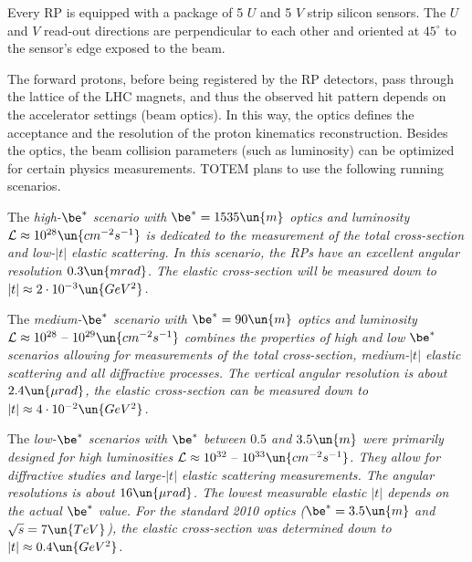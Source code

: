 
Every RP is equipped with a package of 5 $U$ and 5 $V$ strip silicon sensors. The $U$ and $V$ read-out directions are perpendicular to each other and oriented at $45^\circ$ to the sensor's edge exposed to the beam.

The forward protons, before being registered by the RP detectors, pass through the lattice of the LHC magnets, and thus the observed hit pattern depends on the accelerator settings (beam optics). In this way, the optics defines the acceptance and the resolution of the proton kinematics reconstruction. Besides the optics, the beam collision parameters (such as luminosity) can be optimized for certain physics measurements. TOTEM plans to use the following running scenarios.

\> The \em{high-$\be^*$} scenario with $\be^* = 1535\un{m}$ optics and luminosity ${\cal L} \approx 10^{28} \un{cm^{-2}s^{-1}}$ is dedicated to the measurement of the total cross-section and low-$|t|$ elastic scattering. In this scenario, the RPs have an excellent angular resolution $0.3\un{mrad}$. The elastic cross-section will be measured down to $|t| \approx 2\cdot10^{-3}\un{GeV^2}$.

\> The \em{medium-$\be^*$} scenario with $\be^* = 90\un{m}$ optics and luminosity ${\cal L} \approx 10^{28} \hbox{ -- } 10^{29}\un{cm^{-2}s^{-1}}$ combines the properties of high and low $\be^*$ scenarios allowing for measurements of the total cross-section, medium-$|t|$ elastic scattering and all diffractive processes. The vertical angular resolution is about $2.4\un{\mu rad}$, the elastic cross-section can be measured down to $|t| \approx 4\cdot 10^{-2}\un{GeV^2}$.

\> The \em{low-$\be^*$} scenarios with $\be^*$ between $0.5$ and $3.5\un{m}$ were primarily designed for high luminosities ${\cal L} \approx 10^{32} \hbox{ -- } 10^{33}\un{cm^{-2}s^{-1}}$. They allow for diffractive studies and large-$|t|$ elastic scattering measurements. The angular resolutions is about $16\un{\mu rad}$. The lowest measurable elastic $|t|$ depends on the actual $\be^*$ value. For the standard 2010 optics ($\be^* = 3.5\un{m}$ and $\sqrt s = 7\un{TeV}$), the elastic cross-section was determined down to $|t| \approx 0.4\un{GeV^2}$.

